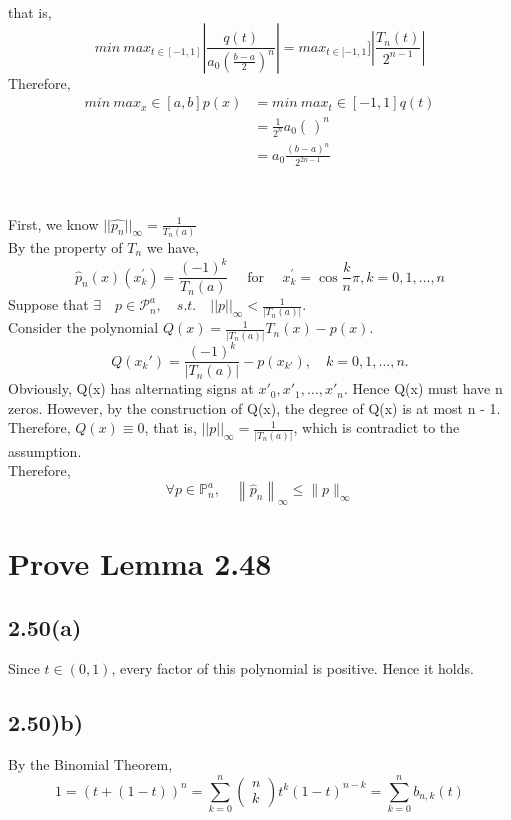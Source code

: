 \documentclass[UTF8]{ctexart}
\begin{document}
that is,
$$min \: max_{t \in [-1,1]} \left| \frac{q(t)}{a_0 \left( \frac{b-a}{2} \right)^n}\right| = max_{t \in [-1,1}] \left| \frac{T_n(t)}{2^{n-1}}\right|$$
Therefore,
\begin{equation}
    \begin{aligned}
        min \: max_x \in [a,b] p(x) &= min \: max_t \in [-1,1] q(t)\\
        &= \frac{1}{2^n}a_0\left(\frac{}{}\right)^n\\
        &= a_0\frac{(b-a)^n}{2^{2n-1}}\\
    \nonumber
    \end{aligned}
\end{equation}

\section{}
\noindent First, we know $||\hat{p_n}||_{\infty} = \frac{1}{T_n(a)}$\\
By the property of $T_n$ we have,
$$\hat{p}_{n}(x)\left(x_{k}^{\prime}\right)=\frac{(-1)^{k}}{T_{n}(a)} \quad \text { for } \quad x_{k}^{\prime}=\cos \frac{k}{n} \pi, k=0,1, \ldots, n$$
Suppose that $\exists \quad p \in \mathcal{P}_n^a,\quad s.t. \quad ||p||_{\infty} <  \frac{1}{|T_n(a)|}$.\\
Consider the polynomial $Q(x) = \frac{1}{|T_n(a)|}T_n(x) - p(x)$.
$$Q(x_k') = \frac{(-1)^k}{|T_n(a)|} - p(x_{k'}),\quad k = 0,1,\dots,n.$$
Obviously, Q(x) has alternating signs at $x'_0,x'_1,\dots,x'_n$. Hence Q(x) must have n zeros. However, by the construction of Q(x), the degree of Q(x) is at most n - 1. Therefore, 
$Q(x) \equiv 0$, that is, $||p||_{\infty} = \frac{1}{|T_n(a)|}$, which is contradict to the assumption.\\
Therefore,
$$\forall p \in \mathbb{P}_{n}^{a}, \quad \left\| \hat{p}_{n}\right\| _{\infty} \leq \|p\|_{\infty}$$

\section{Prove Lemma 2.48}
\subsection*{2.50(a)}
Since $t \in (0,1)$, every factor of this polynomial is positive. Hence it holds.

\subsection*{2.50)b)}
By the Binomial Theorem,
$$1=(t+(1-t))^{n}=\sum_{k=0}^{n}\left(\begin{array}{l}
n \\
k
\end{array}\right) t^{k}(1-t)^{n-k}=\sum_{k=0}^{n} b_{n, k}(t)$$
\end{document}
